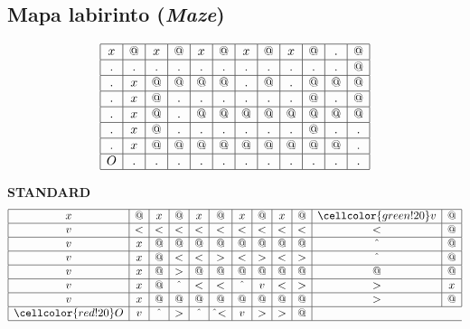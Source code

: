 \documentclass{article}
\begin{document}
\subsection{Mapa labirinto (\textit{Maze})}

\[
	\begin{array}{|c|c|c|c|c|c|c|c|c|c|c|c|}
		\hline
		x & @ & x & @ & x & @ & x & @ & x & @ & . & @ \\ \hline
		. & . & . & . & . & . & . & . & . & . & . & @ \\ \hline
		. & x & @ & @ & @ & @ & . & @ & . & @ & @ & @ \\ \hline
		. & x & @ & . & . & . & . & . & . & @ & . & @ \\ \hline
		. & x & @ & . & @ & @ & @ & @ & @ & @ & @ & @ \\ \hline
		. & x & @ & . & . & . & . & . & . & @ & . & . \\ \hline
		. & x & @ & @ & @ & @ & @ & @ & @ & @ & @ & . \\ \hline
		O & . & . & . & . & . & . & . & . & . & . & . \\ \hline
	\end{array}
\]

\vspace{10pt}


\centering \small \textbf{STANDARD}
\[
	\begin{array}{|c|c|c|c|c|c|c|c|c|c|c|c|}
		\hline
		x                   & @ & x      & @      & x      & @        & x      & @ & x & @ & \cellcolor{green!20}v & @ \\ \hline
		v                   & < & <      & <      & <      & <        & <      & < & < & < & <                     & @ \\ \hline
		v                   & x & @      & @      & @      & @        & @      & @ & @ & @ & \hat{}                & @ \\ \hline
		v                   & x & @      & <      & <      & >        & <      & > & < & > & \hat{}                & @ \\ \hline
		v                   & x & @      & >      & @      & @        & @      & @ & @ & @ & @                     & @ \\ \hline
		v                   & x & @      & \hat{} & <      & <        & \hat{} & v & < & > & >                     & x \\ \hline
		v                   & x & @      & @      & @      & @        & @      & @ & @ & @ & >                     & @ \\ \hline
		\cellcolor{red!20}O & v & \hat{} & >      & \hat{} & \hat{} < & v      & > & > & @                             \\ \hline
	\end{array}
\]
\end{document}
